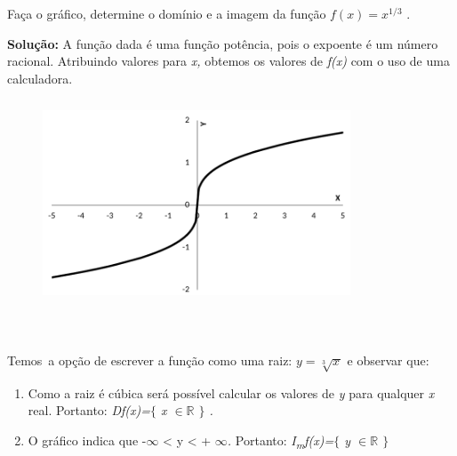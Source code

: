 \begin{texemplo}
	
Faça o gráfico, determine o domínio e a imagem da função  \( f \left( x \right) =x^{1/3} \) .

\textbf{Solução:} A função dada é uma função potência, pois o expoente é um número racional. Atribuindo valores para \textit{x,} obtemos os valores de \textit{f(x)} com o uso de uma calculadora. 

\begin{figure}[H]
	\begin{Center}
		\includegraphics[width=3.6in,height=2.41in]{capitulos/outras_funcoes/media/image4.pdf}
	\end{Center}
\end{figure}

~~

\quad 

Temos~a opção de escrever a função como uma raiz:   \( y=\sqrt[3]{x^{}} \)  e observar que: 

\begin{enumerate}
	\item Como a raiz é cúbica será possível calcular os valores de \textit{y} para qualquer  \textit{x} real. Portanto: \textit{Df(x)=$ \{ $  x $ \in \mathbb{R} $  \textbf{ }$ \} $ .}

	\item \textit{ }O gráfico indica que -$\infty$ < y < + $\infty$\textit{. } Portanto: \textit{I\textsubscript{m}f(x)=$ \{ $ y $ \in \mathbb{R} $  $ \} $  }\qedsymbol{} 
\end{enumerate}
\end{texemplo}

